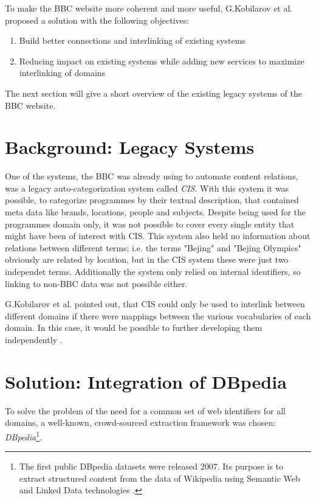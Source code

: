 \documentclass{llncs}
\begin{document}
\vspace{15mm}

To make the BBC website more coherent and more useful, G.Kobilarov et al. proposed a solution \cite{mmsw} with the following objectives:
\begin{enumerate}
  \item Build better connections and interlinking of existing systems
  \item Reducing impact on existing systems while adding new services to maximize interlinking of domains
\end{enumerate}

The next section will give a short overview of the existing legacy systems of the BBC website.

\section{Background: Legacy Systems}

One of the systems, the BBC was already using to automate content relations, was a legacy auto-categorization system called \textit{CIS}. With this system it was possible, to categorize programmes by their textual description, that contained meta data like brands, locations, people and subjects. Despite being used for the programmes domain only, it was not possible to cover every single entity that might have been of interest with CIS. This system also held no information about relations between different terms; i.e. the terms "Bejing" and "Bejing Olympics" obviously are related by location, but in the CIS system these were just two independet terms. Additionally the system only relied on internal identifiers, so linking to non-BBC data was not possible either.

G.Kobilarov et al. pointed out, that CIS could only be used to interlink between different domains if there were mappings between the various vocabularies of each domain. In this case, it would be possible to further developing them independently \cite{mmsw}.

\section{Solution: Integration of DBpedia}

To solve the problem of the need for a common set of web identifiers for all domains, a well-known, crowd-sourced extraction framework was chosen: \textit{DBpedia}\footnote{The first public DBpedia datasets were released 2007. Its purpose is to extract structured content from the data of Wikipedia using Semantic Web and Linked Data technologies \cite{dbpedia}.}.
\end{document}
